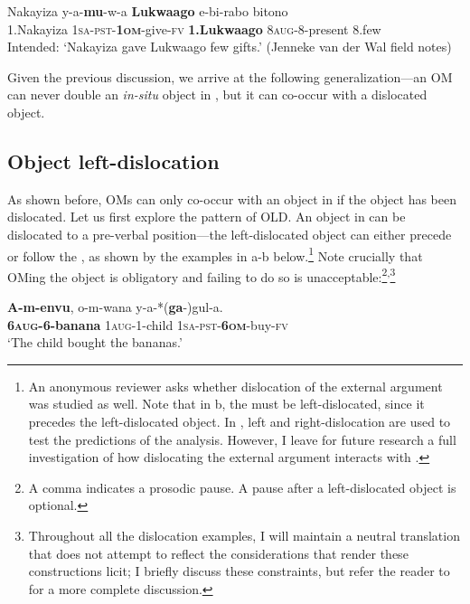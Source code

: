 \documentclass[output=paper,newtxmath,modfonts,nonflat,hidelinks]{langsci/langscibook}
\begin{document}
\ea\label{ex:ranero:13}
\gll *Nakayiza  y-a-\textbf{mu}{}-w-a                   \textbf{Lukwaago}    e-bi-rabo            bitono\\
1.Nakayiza \textsc{1sa-pst-}\textbf{\textsc{1om}}{}-give-\textsc{fv} \textbf{1.Lukwaago} 8\textsc{aug}{}-8-present 8.few\\
\glt Intended: ‘Nakayiza gave Lukwaago few gifts.’ (Jenneke van der Wal field notes)
\z

Given the previous discussion, we arrive at the following generalization—an OM can never double an \textit{in-situ} object in , but it can co-occur with a dislocated object.

\subsection{Object left-dislocation}\label{sec:ranero:3.2}

As shown before, OMs can only co-occur with an object in  if the object has been dislocated. Let us first explore the pattern of OLD. An object in  can be dislocated to a pre-verbal position—the left-dislocated object can either precede or follow the , as shown by the examples in a-b below.\footnote{An anonymous reviewer asks whether dislocation of the external argument was studied as well. Note that in b, the  must be left-dislocated, since it precedes the left-dislocated object. In ,  left and right-dislocation are used to test the predictions of the analysis. However, I leave for future research a full investigation of how dislocating the external argument interacts with .} Note crucially that OMing the object is obligatory and failing to do so is unacceptable:\footnote{A comma indicates a prosodic pause. A pause after a left-dislocated object is optional.}\textsuperscript{,}\footnote{Throughout all the dislocation examples, I will maintain a neutral translation that does not attempt to reflect the  considerations that render these constructions licit; I briefly discuss these  constraints, but refer the reader to \citet{ranero2015} for a more complete discussion.}

\ea\label{ex:ranero:14}
\ea\label{ex:ranero:14a}
\gll \textbf{A-m-envu},         o-m-wana       y-a-*(\textbf{ga}{}-)gul-a.\\
\textbf{6\textsc{aug}}\textbf{{}-6-banana} 1\textsc{aug}{}-1-child \textsc{1sa-pst-}\textbf{\textsc{6om}}{}-buy-\textsc{fv}\\
\glt ‘The child bought the bananas.’
\end{document}
